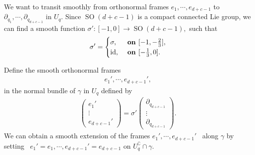 \documentclass[11pt,a4paper]{amsart}
\numberwithin{equation}{section}
\newcommand{\ga}{\gamma}
\newcommand{\e}{\epsilon}
\newcommand{\si}{\sigma}
\newcommand{\cd}{\cdots}
\newcommand{\cp}{^\complement}
\newcommand{\pd}{\partial}
\newcommand{\id}{\textnormal{id}}
\theoremstyle{plain}
\theoremstyle{definition}
\numberwithin{equation}{subsection}
\begin{document}
	We want to transit smoothly from orthonormal frames $e_1,\cd,e_{d+c-1}$ to $\pd_{q_1},\cd,\pd_{q_{d+c-1}}$ in $U_q$. Since $\operatorname{SO}(d+c-1)$ is a compact connected Lie group, we can find a smooth function $\si':[-1,0]\to \operatorname{SO}(d+c-1),$ such that
	\begin{align*}
		\si'=\begin{cases}
			\si,&\textbf{ on }[-1,-\frac{2}{3}],\\
			\id,&\textbf{ on }[-\frac{1}{3},0].\end{cases}
	\end{align*}%
	
	
	Define the smooth orthonormal frames 
	\begin{align*}
		e_1',\cd,e_{d+c-1}',
	\end{align*}
	in the normal bundle of $\ga$ in $U_q$ defined by
	\begin{align*}
		\begin{pmatrix}
			e_1'\\\vdots \\e_{d+c-1}'
		\end{pmatrix}=\si' 
		\begin{pmatrix}
			\pd_{q_{d+c-1}}\\\vdots \\\pd_{q_{d+c-1}}
		\end{pmatrix}.
	\end{align*}
	We can obtain a smooth extension of the frames $e_1',\cd,e_{d+c-1}'$  along $\ga$ by setting  $e_1'=e_1,\cd,e_{d+c-1}'=e_{d+c-1}$ on $ U_q\cp\cap \ga.$
	
\end{document}
